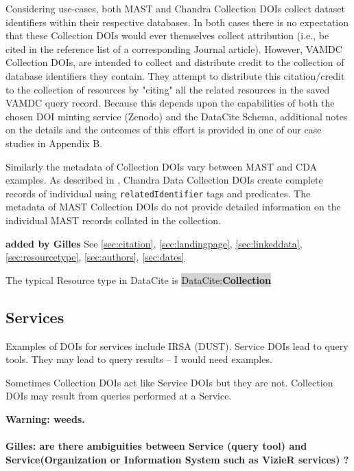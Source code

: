 \documentclass[11pt,a4paper]{ivoa}
\newcommand{\dataciteterm}[1]{\colorbox{lightgray}{DataCite:\textbf{#1}}}
\begin{document}
Considering use-cases, both MAST and Chandra Collection DOIs collect dataset identifiers within their respective databases.
In both cases there is no expectation that these Collection DOIs would ever themselves collect attribution (i.e., be cited in the reference list of a corresponding Journal article).
However, VAMDC Collection DOIs, are intended to collect and distribute credit to the collection of database identifiers they contain.
They attempt to distribute this citation/credit to the collection of resources by "citing" all the related resources in the saved VAMDC query record.
Because this depends upon the capabilities of both the chosen DOI minting service (Zenodo) and the DataCite Schema, additional notes on the details and the outcomes of this effort is provided in one of our case studies in Appendix B. 

Similarly the metadata of Collection DOIs vary between MAST and CDA examples. 
As described in \citet{2023ChNew..34....5D}, Chandra Data Collection DOIs create complete records of individual using \texttt{relatedIdentifier} tags and predicates. 
The metadata of MAST Collection DOIs do not provide detailed information on the individual MAST records collated in the collection.


\textbf{\color{red} added by Gilles}
See \ref{sec:citation}, \ref{sec:landingpage}, \ref{sec:linkeddata}, \ref{sec:resourcetype}, \ref{sec:authors}, \ref{sec:dates}

The typical Resource type in DataCite is \dataciteterm{Collection}

\subsection{Services}
\label{sec:intro:services}

Examples of DOIs for services include IRSA (DUST).
Service DOIs lead to query tools.
They may lead to query results -- I would need examples.

Sometimes Collection DOIs act like Service DOIs but they are not.
Collection DOIs may result from queries performed at a Service.

\textbf{Warning: weeds.}

\paragraph{}
\textbf{\color{red} Gilles: are there ambiguities between Service (query tool) and Service(Organization or Information System such as VizieR services) ?\\}
\end{document}
